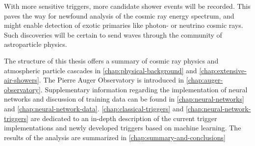 With more sensitive triggers, more candidate shower events will be recorded. This paves the way for newfound analysis of the cosmic ray energy spectrum, and might
enable detection of exotic primaries like photon- or neutrino cosmic rays. Such discoveries will be certain to send waves through the community of astroparticle 
physics.

The structure of this thesis offers a summary of cosmic ray physics and atmospheric particle cascades in \autoref{chap:physical-background} and 
\autoref{chap:extensive-air-showers}. The Pierre Auger Observatory is introduced in \autoref{chap:auger-observatory}. Supplementary information regarding the 
implementation of neural networks and discussion of training data can be found in  \autoref{chap:neural-networks} and \autoref{chap:neural-network-data}. 
\autoref{chap:classical-triggers} and \autoref{chap:neural-network-triggers} are dedicated to an in-depth description of the current trigger implementations and 
newly developed triggers based on machine learning. The results of the analysis are summarized in \autoref{chap:summary-and-conclusions}



